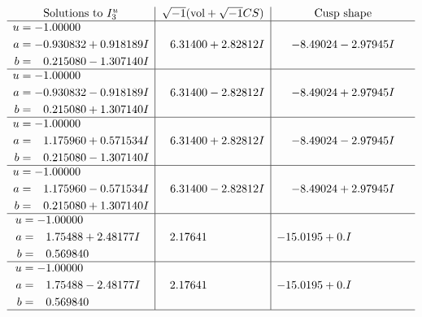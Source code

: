 \documentclass[1p]{elsarticle_modified}
\theoremstyle{definition}
\newcommand{\I}{\sqrt{-1}}
\begin{document}
$$\begin{array}{c|c|c}  
\text{Solutions to }I^u_{3}& \I (\text{vol} + \sqrt{-1}CS) & \text{Cusp shape}\\
 \hline 
\begin{aligned}
u &= -1.00000\phantom{ +0.000000I} \\
a &= -0.930832 + 0.918189 I \\
b &= \phantom{-}0.215080 - 1.307140 I\end{aligned}
 & \phantom{-}6.31400 + 2.82812 I & -8.49024 - 2.97945 I \\ \hline\begin{aligned}
u &= -1.00000\phantom{ +0.000000I} \\
a &= -0.930832 - 0.918189 I \\
b &= \phantom{-}0.215080 + 1.307140 I\end{aligned}
 & \phantom{-}6.31400 - 2.82812 I & -8.49024 + 2.97945 I \\ \hline\begin{aligned}
u &= -1.00000\phantom{ +0.000000I} \\
a &= \phantom{-}1.175960 + 0.571534 I \\
b &= \phantom{-}0.215080 - 1.307140 I\end{aligned}
 & \phantom{-}6.31400 + 2.82812 I & -8.49024 - 2.97945 I \\ \hline\begin{aligned}
u &= -1.00000\phantom{ +0.000000I} \\
a &= \phantom{-}1.175960 - 0.571534 I \\
b &= \phantom{-}0.215080 + 1.307140 I\end{aligned}
 & \phantom{-}6.31400 - 2.82812 I & -8.49024 + 2.97945 I \\ \hline\begin{aligned}
u &= -1.00000\phantom{ +0.000000I} \\
a &= \phantom{-}1.75488 + 2.48177 I \\
b &= \phantom{-}0.569840\phantom{ +0.000000I}\end{aligned}
 & \phantom{-}2.17641\phantom{ +0.000000I} & -15.0195 + 0. I\phantom{ +0.000000I} \\ \hline\begin{aligned}
u &= -1.00000\phantom{ +0.000000I} \\
a &= \phantom{-}1.75488 - 2.48177 I \\
b &= \phantom{-}0.569840\phantom{ +0.000000I}\end{aligned}
 & \phantom{-}2.17641\phantom{ +0.000000I} & -15.0195 + 0. I\phantom{ +0.000000I}\\
 \hline 
 \end{array}$$\newpage\newpage\renewcommand{\arraystretch}{1}
\end{document}
